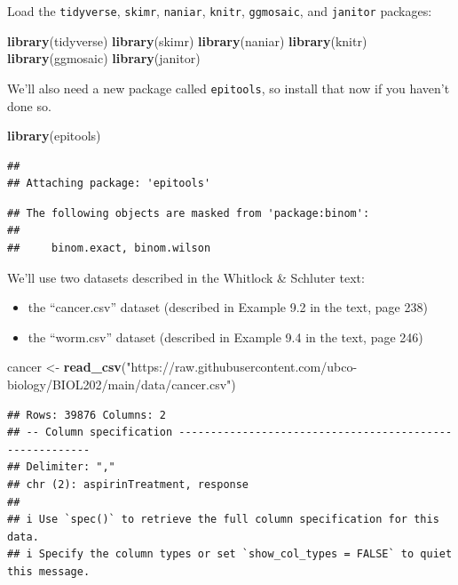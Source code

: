 \documentclass[
]{book}
\newenvironment{Shaded}{\begin{snugshade}}{\end{snugshade}}
\newcommand{\FunctionTok}[1]{\textcolor[rgb]{0.13,0.29,0.53}{\textbf{#1}}}
\newcommand{\NormalTok}[1]{#1}
\newcommand{\OtherTok}[1]{\textcolor[rgb]{0.56,0.35,0.01}{#1}}
\newcommand{\StringTok}[1]{\textcolor[rgb]{0.31,0.60,0.02}{#1}}
\providecommand{\tightlist}{%
  \setlength{\itemsep}{0pt}\setlength{\parskip}{0pt}}
\begin{document}
Load the \texttt{tidyverse}, \texttt{skimr}, \texttt{naniar}, \texttt{knitr}, \texttt{ggmosaic}, and \texttt{janitor} packages:

\begin{Shaded}
\begin{Highlighting}[]
\FunctionTok{library}\NormalTok{(tidyverse)}
\FunctionTok{library}\NormalTok{(skimr)}
\FunctionTok{library}\NormalTok{(naniar)}
\FunctionTok{library}\NormalTok{(knitr)}
\FunctionTok{library}\NormalTok{(ggmosaic)}
\FunctionTok{library}\NormalTok{(janitor)}
\end{Highlighting}
\end{Shaded}

We'll also need a new package called \texttt{epitools}, so install that now if you haven't done so.

\begin{Shaded}
\begin{Highlighting}[]
\FunctionTok{library}\NormalTok{(epitools)}
\end{Highlighting}
\end{Shaded}

\begin{verbatim}
## 
## Attaching package: 'epitools'
\end{verbatim}

\begin{verbatim}
## The following objects are masked from 'package:binom':
## 
##     binom.exact, binom.wilson
\end{verbatim}

We'll use two datasets described in the Whitlock \& Schluter text:

\begin{itemize}
\tightlist
\item
  the ``cancer.csv'' dataset (described in Example 9.2 in the text, page 238)
\item
  the ``worm.csv'' dataset (described in Example 9.4 in the text, page 246)
\end{itemize}

\begin{Shaded}
\begin{Highlighting}[]
\NormalTok{cancer }\OtherTok{\textless{}{-}} \FunctionTok{read\_csv}\NormalTok{(}\StringTok{"https://raw.githubusercontent.com/ubco{-}biology/BIOL202/main/data/cancer.csv"}\NormalTok{)}
\end{Highlighting}
\end{Shaded}

\begin{verbatim}
## Rows: 39876 Columns: 2
## -- Column specification --------------------------------------------------------
## Delimiter: ","
## chr (2): aspirinTreatment, response
## 
## i Use `spec()` to retrieve the full column specification for this data.
## i Specify the column types or set `show_col_types = FALSE` to quiet this message.
\end{verbatim}
\end{document}
